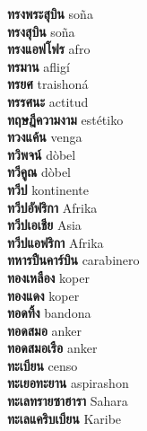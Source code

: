 \textbf{ ทรงพระสุบิน  } soña \\
\textbf{ ทรงสุบิน  } soña \\
\textbf{ ทรงแอฟโฟร  } afro \\
\textbf{ ทรมาน  } afligí \\
\textbf{ ทรยศ  } traishoná \\
\textbf{ ทรรศนะ  } actitud \\
\textbf{ ทฤษฎีความงาม  } estétiko \\
\textbf{ ทวงแค้น  } venga \\
\textbf{ ทวิพจน์  } dòbel \\
\textbf{ ทวีคูณ  } dòbel \\
\textbf{ ทวีป  } kontinente \\
\textbf{ ทวีปอัฟริกา  } Afrika \\
\textbf{ ทวีปเอเชีย  } Asia \\
\textbf{ ทวีปแอฟริกา  } Afrika \\
\textbf{ ทหารปืนคาร์บิน  } carabinero \\
\textbf{ ทองเหลือง  } koper \\
\textbf{ ทองแดง  } koper \\
\textbf{ ทอดทิ้ง  } bandona \\
\textbf{ ทอดสมอ  } anker \\
\textbf{ ทอดสมอเรือ  } anker \\
\textbf{ ทะเบียน  } censo \\
\textbf{ ทะเยอทะยาน  } aspirashon \\
\textbf{ ทะเลทรายซาฮารา  } Sahara \\
\textbf{ ทะเลแคริบเบียน  } Karibe \\

